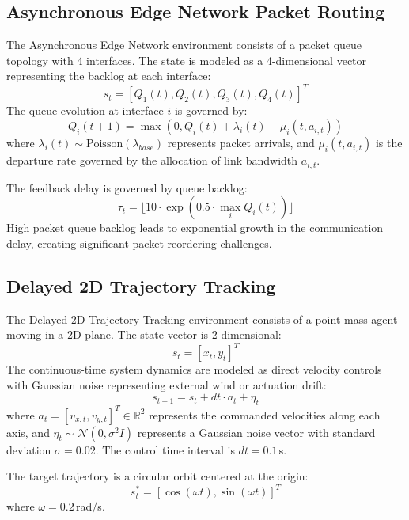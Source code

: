 \documentclass[manuscript, screen, review]{jair}
\begin{document}
\subsection{Asynchronous Edge Network Packet Routing}\label{app:sub_edge_network}
The Asynchronous Edge Network environment consists of a packet queue topology with 4 interfaces. The state is modeled as a 4-dimensional vector representing the backlog at each interface:
\begin{equation}
    s_t = [Q_1(t), Q_2(t), Q_3(t), Q_4(t)]^T
\end{equation}
The queue evolution at interface $i$ is governed by:
\begin{equation}
    Q_i(t+1) = \max\left(0, Q_i(t) + \lambda_i(t) - \mu_i(t, a_{i, t})\right)
\end{equation}
where $\lambda_i(t) \sim \text{Poisson}(\lambda_{base})$ represents packet arrivals, and $\mu_i(t, a_{i, t})$ is the departure rate governed by the allocation of link bandwidth $a_{i, t}$.

The feedback delay is governed by queue backlog:
\begin{equation}
    \tau_t = \lfloor 10 \cdot \exp(0.5 \cdot \max_i Q_i(t)) \rfloor
\end{equation}
High packet queue backlog leads to exponential growth in the communication delay, creating significant packet reordering challenges.

\subsection{Delayed 2D Trajectory Tracking}\label{app:sub_tracking}
The Delayed 2D Trajectory Tracking environment consists of a point-mass agent moving in a 2D plane. The state vector is 2-dimensional:
\begin{equation}
    s_t = [x_t, y_t]^T
\end{equation}
The continuous-time system dynamics are modeled as direct velocity controls with Gaussian noise representing external wind or actuation drift:
\begin{equation}
    s_{t+1} = s_t + dt \cdot a_t + \eta_t
\end{equation}
where $a_t = [v_{x,t}, v_{y,t}]^T \in \mathbb{R}^2$ represents the commanded velocities along each axis, and $\eta_t \sim \mathcal{N}(0, \sigma^2 I)$ represents a Gaussian noise vector with standard deviation $\sigma = 0.02$. The control time interval is $dt = 0.1$\,s.

The target trajectory is a circular orbit centered at the origin:
\begin{equation}
    s^*_t = [\cos(\omega t), \sin(\omega t)]^T
\end{equation}
where $\omega = 0.2$\,rad/s.
\end{document}
